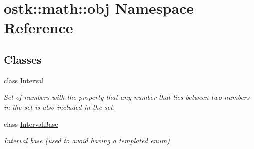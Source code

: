 \hypertarget{namespaceostk_1_1math_1_1obj}{}\section{ostk\+:\+:math\+:\+:obj Namespace Reference}
\label{namespaceostk_1_1math_1_1obj}
\subsection*{Classes}
\begin{DoxyCompactItemize}
\item 
class \hyperlink{classostk_1_1math_1_1obj_1_1_interval}{Interval}
\begin{DoxyCompactList}\small\item\em Set of numbers with the property that any number that lies between two numbers in the set is also included in the set. \end{DoxyCompactList}\item 
class \hyperlink{classostk_1_1math_1_1obj_1_1_interval_base}{Interval\+Base}
\begin{DoxyCompactList}\small\item\em \hyperlink{classostk_1_1math_1_1obj_1_1_interval}{Interval} base (used to avoid having a templated enum) \end{DoxyCompactList}\end{DoxyCompactItemize}

